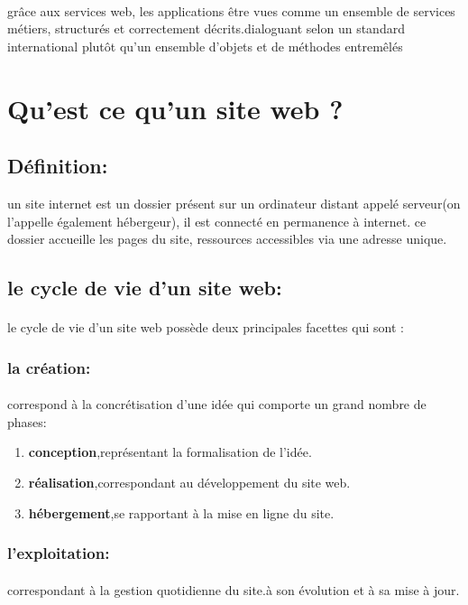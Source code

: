 \paragraph{}
grâce aux services web, les applications être vues comme un ensemble de services métiers, structurés et correctement décrits.dialoguant selon un standard international plutôt qu'un ensemble d'objets et de méthodes entremêlés
\section{Qu'est ce qu'un site web ?}
\subsection{Définition:}
un site internet est un dossier présent sur un ordinateur distant appelé serveur(on l'appelle également hébergeur), il est connecté en permanence à internet. ce dossier accueille les pages du site, ressources accessibles via une adresse unique.
\subsection{le cycle de vie d'un site web:}
\paragraph{}
le cycle de vie d'un site web possède deux principales facettes qui sont :
\subsubsection{la création:}
\paragraph{}
correspond à la concrétisation d'une idée qui comporte un grand nombre de phases:
\begin{enumerate}
	\item \textbf{conception},représentant la formalisation de l'idée.
	\item \textbf{réalisation},correspondant au développement du site web.
	\item \textbf{hébergement},se rapportant à la mise en ligne du site.
\end{enumerate}

\subsubsection{l'exploitation:}
\paragraph{}
correspondant à la gestion quotidienne du site.à son évolution et à sa mise à jour.

